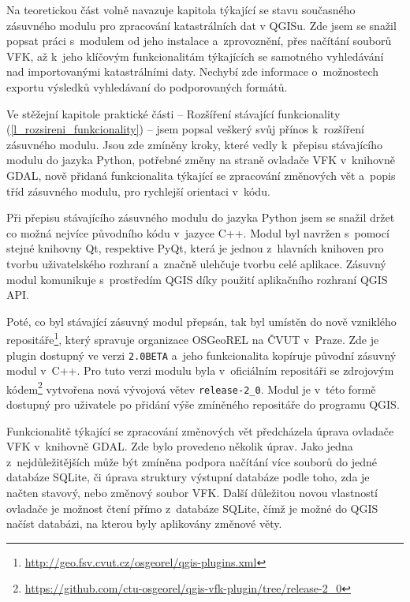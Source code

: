 \documentclass[a4paper,12pt,oneside]{book}
\begin{document}
Na teoretickou část volně navazuje kapitola týkající se stavu
současného zásuvného modulu pro zpracování katastrálních dat v
QGISu. Zde jsem se snažil popsat práci s~modulem od jeho instalace
a~zprovoznění, přes načítání souborů VFK, až k~jeho klíčovým
funkcionalitám týkajících se samotného vyhledávání nad importovanými
katastrálními daty. Nechybí zde informace o~možnostech exportu
výsledků vyhledávaní do podporovaných formátů.

Ve stěžejní kapitole praktické části -- Rozšíření stávající
funkcionality (\ref{l_rozsireni_funkcionality}) -- jsem popsal veškerý
svůj přínos k~rozšíření zásuvného modulu. Jsou zde zmíněny kroky,
které vedly k~přepisu stávajícího modulu do jazyka Python, potřebné
změny na straně ovladače VFK v~knihovně GDAL, nově přidaná
funkcionalita týkající se zpracování změnových vět a~popis tříd
zásuvného modulu, pro rychlejší orientaci v~kódu.

Při přepisu stávajícího zásuvného modulu do jazyka Python jsem se
snažil držet co možná nejvíce původního kódu v~jazyce C++. Modul byl
navržen s~pomocí stejné knihovny Qt, respektive PyQt, která je jednou
z~hlavních knihoven pro tvorbu uživatelského rozhraní a~značně
ulehčuje tvorbu celé aplikace. Zásuvný modul komunikuje s~prostředím
QGIS díky použití aplikačního rozhraní QGIS API.

Poté, co byl stávající zásuvný modul přepsán, tak byl umístěn do nově
vzniklého
repositáře\footnote{\url{http://geo.fsv.cvut.cz/osgeorel/qgis-plugins.xml}},
který spravuje organizace OSGeoREL na ČVUT v~Praze. Zde je plugin
dostupný ve verzi \texttt{2.0BETA} a~jeho funkcionalita kopíruje
původní zásuvný modul v~C++. Pro tuto verzi modulu byla v~oficiálním
repositáři se zdrojovým
kódem\footnote{\url{https://github.com/ctu-osgeorel/qgis-vfk-plugin/tree/release-2_0}}
vytvořena nová vývojová větev \texttt{release-2\_0}. Modul je v~této
formě dostupný pro uživatele po přidání výše zmíněného repositáře do
programu QGIS.

Funkcionalitě týkající se zpracování změnových vět předcházela úprava
ovladače VFK v~knihovně GDAL. Zde bylo provedeno několik úprav. Jako
jedna z~nejdůležitějších může být zmíněna podpora načítání více
souborů do jedné databáze SQLite, či úprava struktury výstupní
databáze podle toho, zda je načten stavový, nebo změnový soubor
VFK. Další důležitou novou vlastností ovladače je možnost čtení přímo
z~databáze SQLite, čímž je možné do QGIS načíst databázi, na kterou
byly aplikovány změnové věty.
\end{document}
